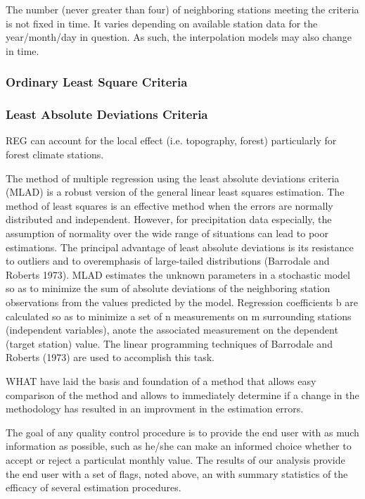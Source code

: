 \documentclass[WHATMANUAL.tex]{subfiles}
\begin{document}
The number (never greater than four) of neighboring stations meeting the criteria is not fixed in time. It varies depending on available station data for the year/month/day in question. As such, the interpolation models may also change in time.

\subsubsection{Ordinary Least Square Criteria}

\subsubsection{Least Absolute Deviations Criteria}
REG can account for the local effect (i.e. topography, forest) particularly for forest climate stations.


The method of multiple regression using the least absolute deviations criteria (MLAD) is a robust version
of the general linear least squares estimation. The method of least squares is an effective method when the errors are normally distributed and independent. However, for precipitation data especially, the assumption of normality over the wide range of situations can lead to poor estimations. The principal advantage of least absolute deviations is its resistance to outliers and to overemphasis of large-tailed distributions (Barrodale and Roberts 1973). MLAD estimates the unknown parameters in a stochastic model so as to minimize the sum of absolute deviations of the neighboring station observations from the values predicted by the model. Regression coefficients b are calculated so as to minimize a set of n measurements on m surrounding stations (independent variables), anote the associated measurement on the dependent (target station) value. The linear programming techniques of Barrodale and Roberts (1973) are used to accomplish this task.

WHAT have laid the basis and foundation of a method that allows easy comparison of the method and allows to immediately determine if a change in the methodology has resulted in an improvment in the estimation errors.

The goal of any quality control procedure is to provide the end user with as much information as possible, such as he/she can make an informed choice whether to accept or reject a particulat monthly value. The results of our analysis provide the end user with a set of flags, noted above, an with summary statistics of the efficacy of several estimation procedures.
\end{document}
